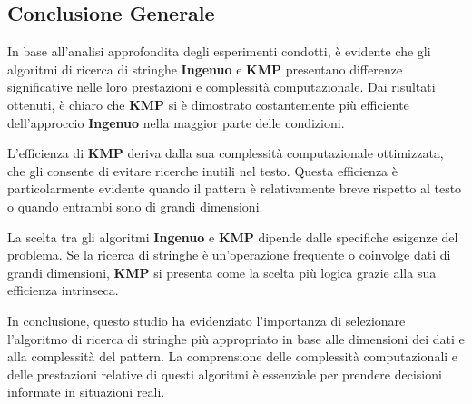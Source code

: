 \subsection{Conclusione Generale}
In base all'analisi approfondita degli esperimenti condotti, è evidente che gli algoritmi di ricerca di stringhe \textbf{Ingenuo} e \textbf{KMP} presentano differenze significative nelle loro prestazioni e complessità computazionale. Dai risultati ottenuti, è chiaro che \textbf{KMP} si è dimostrato costantemente più efficiente dell'approccio \textbf{Ingenuo} nella maggior parte delle condizioni.

L'efficienza di \textbf{KMP} deriva dalla sua complessità computazionale ottimizzata, che gli consente di evitare ricerche inutili nel testo. Questa efficienza è particolarmente evidente quando il pattern è relativamente breve rispetto al testo o quando entrambi sono di grandi dimensioni.

La scelta tra gli algoritmi \textbf{Ingenuo} e \textbf{KMP} dipende dalle specifiche esigenze del problema. Se la ricerca di stringhe è un'operazione frequente o coinvolge dati di grandi dimensioni, \textbf{KMP} si presenta come la scelta più logica grazie alla sua efficienza intrinseca.

In conclusione, questo studio ha evidenziato l'importanza di selezionare l'algoritmo di ricerca di stringhe più appropriato in base alle dimensioni dei dati e alla complessità del pattern. La comprensione delle complessità computazionali e delle prestazioni relative di questi algoritmi è essenziale per prendere decisioni informate in situazioni reali.